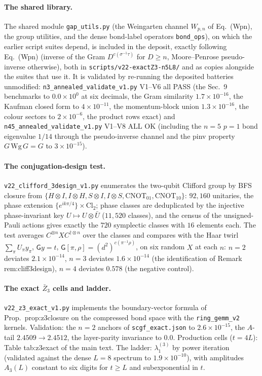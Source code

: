 \documentclass[aps,prx,reprint,superscriptaddress,nobibnotes,longbibliography]{revtex4-2}
\begin{document}
\paragraph{The shared library.}
The shared module \texttt{gap\_utils.py} (the Weingarten channel
$W_{p,n}$ of Eq.~(Wpn), the group utilities, and the dense bond-label
operators \texttt{bond\_ops}), on which the earlier script suites depend,
is included in the deposit, exactly following Eq.~(Wpn) (inverse of the
Gram $D^{c(\sigma^{-1}\tau)}$ for $D\ge n$, Moore--Penrose pseudo-inverse
otherwise), both in \texttt{scripts/v22-exactZ3-n5L8/} and as copies
alongside the suites that use it.  It is validated by re-running the
deposited batteries unmodified: \texttt{n3\_annealed\_validate\_v1.py} V1--V6 all
PASS (the Sec.~9 benchmarks to $0.0\times10^{0}$ at six decimals, the
Gram similarity $1.7\times10^{-16}$, the Kaufman closed form to
$4\times10^{-11}$, the momentum-block union $1.3\times10^{-16}$, the
colour sectors to $2\times10^{-6}$, the product rows exact) and
\texttt{n45\_annealed\_validate\_v1.py} V1--V8 ALL OK (including the
$n=5$ $p=1$ bond eigenvalue $1/14$ through the pseudo-inverse channel and
the pinv property $G\,\mathrm{Wg}\,G=G$ to $3\times10^{-15}$).

\paragraph{The conjugation-design test.}
\texttt{v22\_clifford\_3design\_v1.py} enumerates the two-qubit Clifford
group by BFS closure from $\{H\otimes I, I\otimes H, S\otimes I,
I\otimes S, \mathrm{CNOT}_{01}, \mathrm{CNOT}_{10}\}$: $92{,}160$
unitaries, the phase extension $\{e^{ik\pi/4}\}\times\mathrm{Cl}_2$;
phase classes are deduplicated by the injective phase-invariant key
$U\mapsto U\otimes\bar U$ ($11{,}520$ classes), and the census of the
unsigned-Pauli actions gives exactly the $720$ symplectic classes with
$16$ elements each.  The test averages $C^{\otimes n}XC^{\dagger\otimes
n}$ over the classes and compares with the Haar twirl
$\sum_\pi U_\pi y_\pi$, $\mathsf Gy=t$,
$\mathsf G[\pi,\rho]=(d^2)^{c(\pi^{-1}\rho)}$, on six random $X$ at each
$n$: $n=2$ deviates $2.1\times10^{-14}$, $n=3$ deviates
$1.6\times10^{-14}$ (the identification of Remark rem:cliff3design),
$n=4$ deviates $0.578$ (the negative control).

\paragraph{The exact $\bar Z_3$ cells and ladder.}
\texttt{v22\_z3\_exact\_v1.py} implements the boundary-vector formula of
Prop.~prop:z3closure on the compressed bond space with the
\texttt{ring\_gemm\_v2} kernels.  Validation: the $n=2$ anchors of
\texttt{scgf\_exact.json} to $2.6\times10^{-15}$, the $A$-tail
$2.4509\to2.4512$, the layer-parity invariance to $0.0$.  Production
cells ($t=4L$): Table tab:z3exact of the main text.  The ladder:
$\lambda_1^{(3)}$ by power iteration (validated against the dense $L=8$
spectrum to $1.9\times10^{-10}$), with amplitudes $A_3(L)$ constant to
six digits for $t\ge L$ and subexponential in $t$.
\end{document}
